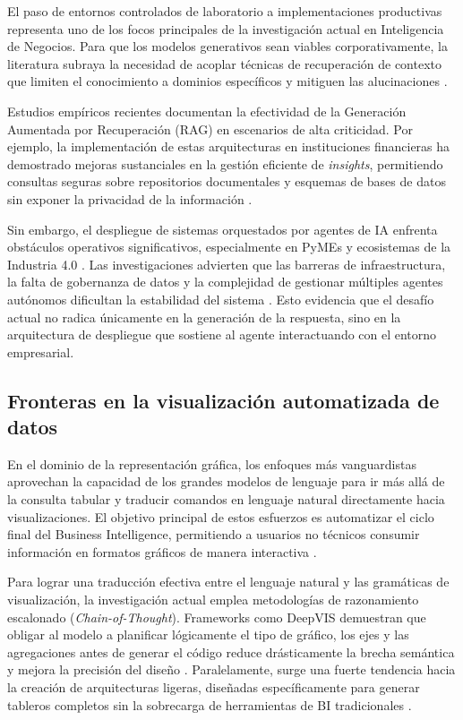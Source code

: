 El paso de entornos controlados de laboratorio a implementaciones productivas
representa uno de los focos principales de la investigación actual en
Inteligencia de Negocios. Para que los modelos generativos sean viables
corporativamente, la literatura subraya la necesidad de acoplar técnicas
de recuperación de contexto que limiten el conocimiento a dominios
específicos y mitiguen las alucinaciones \citep{bourdin2024modelos}.

Estudios empíricos recientes documentan la efectividad de la Generación
Aumentada por Recuperación (RAG) en escenarios de alta criticidad. Por ejemplo,
la implementación de estas arquitecturas en instituciones financieras ha
demostrado mejoras sustanciales en la gestión eficiente de \textit{insights},
permitiendo consultas seguras sobre repositorios documentales y esquemas
de bases de datos sin exponer la privacidad de la información
\citep{arguello2025rag}.

Sin embargo, el despliegue de sistemas orquestados por agentes de IA enfrenta
obstáculos operativos significativos, especialmente en PyMEs y ecosistemas
de la Industria 4.0 \citep{bourdin2024modelos}. Las investigaciones
advierten que las barreras de infraestructura, la falta de gobernanza de datos
y la complejidad de gestionar múltiples agentes autónomos dificultan la
estabilidad del sistema \citep{maddila2024agentes}. Esto evidencia que el
desafío actual no radica únicamente en la generación de la respuesta, sino
en la arquitectura de despliegue que sostiene al agente interactuando
con el entorno empresarial.

\subsection{Fronteras en la visualización automatizada de datos}

En el dominio de la representación gráfica, los enfoques más vanguardistas
aprovechan la capacidad de los grandes modelos de lenguaje para ir más allá de
la consulta tabular y traducir comandos en lenguaje natural directamente hacia
visualizaciones. El objetivo principal de estos esfuerzos es automatizar el
ciclo final del Business Intelligence, permitiendo a usuarios no técnicos
consumir información en formatos gráficos de manera interactiva
\citep{perez2026ia}.

Para lograr una traducción efectiva entre el lenguaje natural y las gramáticas
de visualización, la investigación actual emplea metodologías de razonamiento
escalonado (\textit{Chain-of-Thought}). Frameworks como DeepVIS demuestran
que obligar al modelo a planificar lógicamente el tipo de gráfico, los ejes
y las agregaciones antes de generar el código reduce drásticamente la
brecha semántica y mejora la precisión del diseño \citep{shuai2025deepvis}.
Paralelamente, surge una fuerte tendencia hacia la creación de arquitecturas
ligeras, diseñadas específicamente para generar tableros completos sin la
sobrecarga de herramientas de BI tradicionales
\citep{shi2026nl2dashboardlightweightcontrollableframework}.

